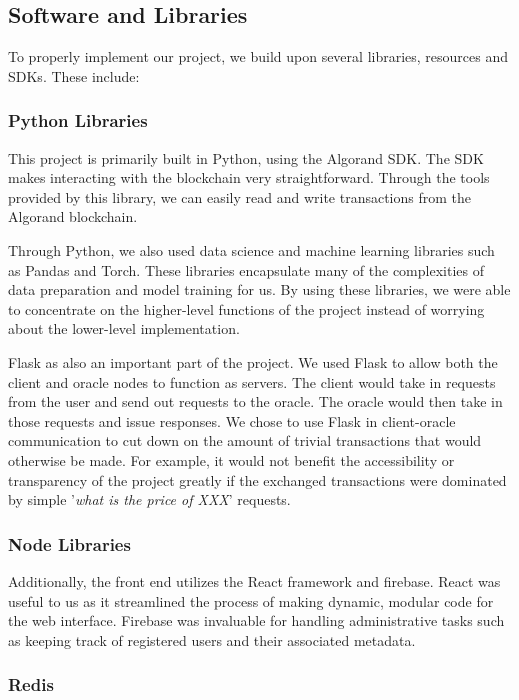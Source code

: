 \documentclass{ledger}
\begin{document}
\subsection{Software and Libraries}

To properly implement our project, we build upon several libraries, resources and SDKs.  These include:

\subsubsection{Python Libraries}

This project is primarily built in Python, using the Algorand SDK.  The SDK makes interacting with the blockchain
very straightforward.  Through the tools provided by this library, we can easily read and write transactions from
the Algorand blockchain.

Through Python, we also used data science and machine learning libraries such as Pandas
and Torch.  These libraries encapsulate many of the complexities of data preparation and model training for us.
By using these libraries, we were able to concentrate on the higher-level functions of the project instead of worrying
about the lower-level implementation.

Flask as also an important part of the project.  We used Flask to allow both
the client and oracle nodes to function as servers.  The client would take in requests from the user and send out
requests to the oracle.  The oracle would then take in those requests and issue responses.  We chose to use Flask in
client-oracle communication to cut down on the amount of trivial transactions that would otherwise be made.  For example,
it would not benefit the accessibility or transparency of the project greatly if the exchanged transactions were
dominated by simple '\textit{what is the price of XXX}' requests.

\subsubsection{Node Libraries}

Additionally, the front end utilizes the React framework and firebase.  React was useful to us as it streamlined the process of making
dynamic, modular code for the web interface.  Firebase was invaluable for handling administrative tasks such as keeping
track of registered users and their associated metadata.

\subsubsection{Redis}
\end{document}
